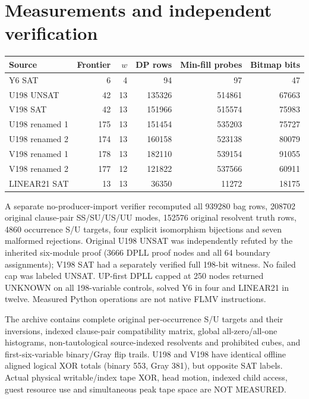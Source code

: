 \documentclass[11pt]{article}
\begin{document}
\section{Measurements and independent verification}
\begin{center}\small\begin{tabular}{lrrrrr}\toprule
Source & Frontier & $w$ & DP rows & Min-fill probes & Bitmap bits\\\midrule
Y6 SAT &6&4&94&97&47\\
U198 UNSAT &42&13&135326&514861&67663\\
V198 SAT &42&13&151966&515574&75983\\
U198 renamed 1 &175&13&151454&535203&75727\\
U198 renamed 2 &174&13&160158&523138&80079\\
V198 renamed 1 &178&13&182110&539154&91055\\
V198 renamed 2 &177&12&121822&537566&60911\\
LINEAR21 SAT &13&13&36350&11272&18175\\\bottomrule
\end{tabular}\end{center}
A separate no-producer-import verifier recomputed all 939280 bag rows, 208702 original clause-pair SS/SU/US/UU modes, 152576 original resolvent truth rows, 4860 occurrence S/U targets, four explicit isomorphism bijections and seven malformed rejections. Original U198 UNSAT was independently refuted by the inherited six-module proof (3666 DPLL proof nodes and all 64 boundary assignments); V198 SAT had a separately verified full 198-bit witness. No failed cap was labeled UNSAT. UP-first DPLL capped at 250 nodes returned UNKNOWN on all 198-variable controls, solved Y6 in four and LINEAR21 in twelve. Measured Python operations are not native FLMV instructions.

The archive contains complete original per-occurrence S/U targets and their inversions, indexed clause-pair compatibility matrix, global all-zero/all-one histograms, non-tautological source-indexed resolvents and prohibited cubes, and first-six-variable binary/Gray flip trails. U198 and V198 have identical offline aligned logical XOR totals (binary 553, Gray 381), but opposite SAT labels. Actual physical writable/index tape XOR, head motion, indexed child access, guest resource use and simultaneous peak tape space are NOT MEASURED.
\end{document}
